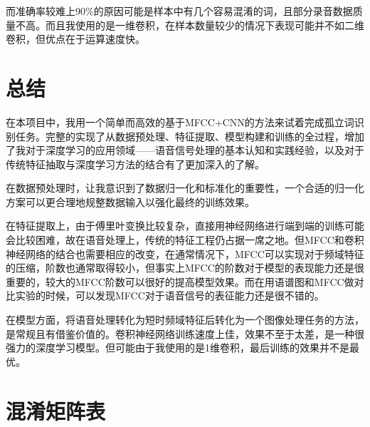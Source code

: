 \documentclass[12pt]{article} %
\begin{document}
而准确率较难上90\%的原因可能是样本中有几个容易混淆的词，且部分录音数据质量不高。而且我使用的是一维卷积，在样本数量较少的情况下表现可能并不如二维卷积，但优点在于运算速度快。


\section{总结}
在本项目中，我用一个简单而高效的基于MFCC+CNN的方法来试着完成孤立词识别任务。完整的实现了从数据预处理、特征提取、模型构建和训练的全过程，增加了我对于深度学习的应用领域——语音信号处理的基本认知和实践经验，以及对于传统特征抽取与深度学习方法的结合有了更加深入的了解。

在数据预处理时，让我意识到了数据归一化和标准化的重要性，一个合适的归一化方案可以更合理地规整数据输入以强化最终的训练效果。

在特征提取上，由于傅里叶变换比较复杂，直接用神经网络进行端到端的训练可能会比较困难，故在语音处理上，传统的特征工程仍占据一席之地。但MFCC和卷积神经网络的结合也需要相应的改变，在通常情况下，MFCC可以实现对于频域特征的压缩，阶数也通常取得较小，但事实上MFCC的阶数对于模型的表现能力还是很重要的，较大的MFCC阶数可以很好的提高模型效果。而在用语谱图和MFCC做对比实验的时候，可以发现MFCC对于语音信号的表征能力还是很不错的。

在模型方面，将语音处理转化为短时频域特征后转化为一个图像处理任务的方法，是常规且有借鉴价值的。卷积神经网络训练速度上佳，效果不至于太差，是一种很强力的深度学习模型。但可能由于我使用的是1维卷积，最后训练的效果并不是最优。


\appendix
\section{混淆矩阵表}\label{ch:conf}
\end{document}
